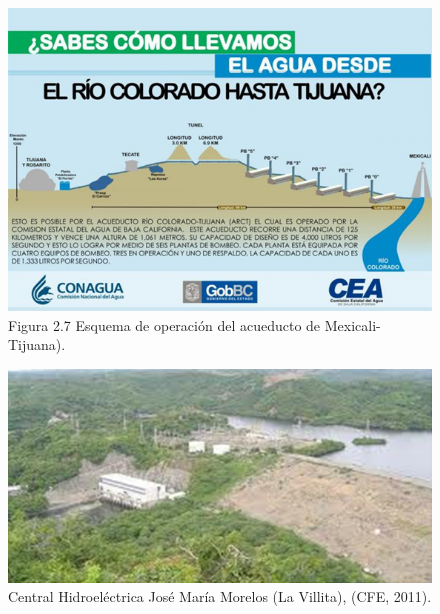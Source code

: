 \documentclass[letterpaper]{report}
\begin{document}
\newpage
\vspace*{2cm}
\begin{figure}[H]
	\centering
	\includegraphics[width=0.7\linewidth]{fig7}
	\caption{Figura 2.7 Esquema de operación del acueducto de Mexicali-Tijuana).}
	\label{fig:fig7}
\end{figure}
\vspace*{1cm}
\begin{figure}[H]
	\centering
	\includegraphics[width=.8\linewidth]{fig8}
	\caption{Central Hidroeléctrica José María Morelos (La Villita), (CFE, 2011).}
	\label{fig:fig8}
\end{figure}
\end{document}
